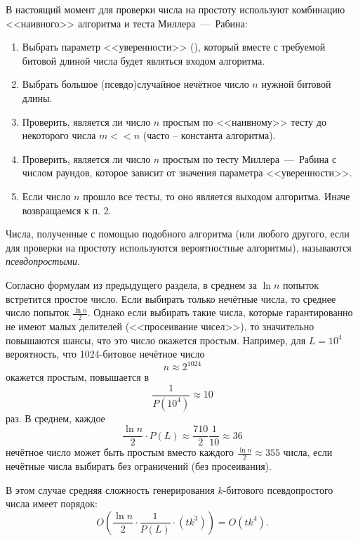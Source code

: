 В настоящий момент для проверки числа на простоту используют комбинацию <<наивного>> алгоритма и теста Миллера~---~Рабина:

\begin{enumerate}
	\item Выбрать параметр <<уверенности>> (), который вместе с требуемой битовой длиной числа будет являться входом алгоритма.
	\item Выбрать большое (псевдо)случайное нечётное число $n$ нужной битовой длины.
	\item Проверить, является ли число $n$ простым по <<наивному>> тесту до некоторого числа $m << n$ (часто -- константа алгоритма).
	\item Проверить, является ли число $n$ простым по тесту Миллера~---~Рабина с числом раундов, которое зависит от значения параметра <<уверенности>>.
	\item Если число $n$ прошло все тесты, то оно является выходом алгоритма. Иначе возвращаемся к п. 2.
\end{enumerate}

Числа, полученные с помощью подобного алгоритма (или любого другого, если для проверки на простоту используются вероятностные алгоритмы), называются \emph{псевдопростыми}.

Согласно формулам из предыдущего раздела, в среднем за $\ln n$ попыток встретится простое число. Если выбирать только нечётные числа, то среднее число попыток $\frac{\ln n}{2}$. Однако если выбирать такие числа, которые гарантированно не имеют малых делителей (<<просеивание чисел>>), то значительно повышаются шансы, что это число окажется простым. Например, для $L = 10^4$ вероятность, что 1024-битовое нечётное число
    \[ n \approx 2^{1024} \]
окажется простым, повышается в
    \[ \frac{1}{P(10^4)} \approx 10 \]
раз. В среднем, каждое
    \[ \frac{\ln n}{2} \cdot P(L) \approx \frac{710}{2} \frac{1}{10} \approx 36 \]
нечётное число может быть простым вместо каждого $\frac{\ln n}{2} \approx 355$ числа, если нечётные числа выбирать без ограничений (без просеивания).

В этом случае средняя сложность генерирования $k$-битового псевдопростого числа имеет порядок:
    \[ O \left( \frac{\ln n}{2} \cdot \frac{1}{P(L)} \cdot \left( t k^3 \right) \right) = O(t k^4). \]
